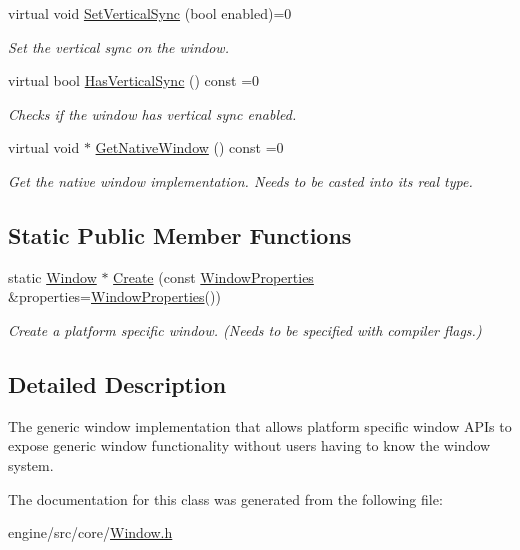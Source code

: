 \begin{DoxyCompactItemize}
virtual void \hyperlink{classengine_1_1Window_a17dd0ec2fd18f4ee6a56ebbed211f45d}{Set\+Vertical\+Sync} (bool enabled)=0
\begin{DoxyCompactList}\small\item\em Set the vertical sync on the window. \end{DoxyCompactList}\item 
\mbox{\label{classengine_1_1Window_a3c1d2e008a8b83a83be692ca864beec1}} 
virtual bool \hyperlink{classengine_1_1Window_a3c1d2e008a8b83a83be692ca864beec1}{Has\+Vertical\+Sync} () const =0
\begin{DoxyCompactList}\small\item\em Checks if the window has vertical sync enabled. \end{DoxyCompactList}\item 
\mbox{\label{classengine_1_1Window_a075f0ad97b7d7d3730a710385abde3d6}} 
virtual void $\ast$ \hyperlink{classengine_1_1Window_a075f0ad97b7d7d3730a710385abde3d6}{Get\+Native\+Window} () const =0
\begin{DoxyCompactList}\small\item\em Get the native window implementation. Needs to be casted into it\textquotesingle{}s real type. \end{DoxyCompactList}\end{DoxyCompactItemize}
\subsection*{Static Public Member Functions}
\begin{DoxyCompactItemize}
\item 
\mbox{\label{classengine_1_1Window_ac835a4aa07cfb1d589f777e54da39932}} 
static \hyperlink{classengine_1_1Window}{Window} $\ast$ \hyperlink{classengine_1_1Window_ac835a4aa07cfb1d589f777e54da39932}{Create} (const \hyperlink{structengine_1_1WindowProperties}{Window\+Properties} \&properties=\hyperlink{structengine_1_1WindowProperties}{Window\+Properties}())
\begin{DoxyCompactList}\small\item\em Create a platform specific window. (Needs to be specified with compiler flags.) \end{DoxyCompactList}\end{DoxyCompactItemize}


\subsection{Detailed Description}
The generic window implementation that allows platform specific window A\+P\+Is to expose generic window functionality without users having to know the window system. 

The documentation for this class was generated from the following file\+:\begin{DoxyCompactItemize}
\item 
engine/src/core/\hyperlink{core_2Window_8h}{Window.\+h}\end{DoxyCompactItemize}
